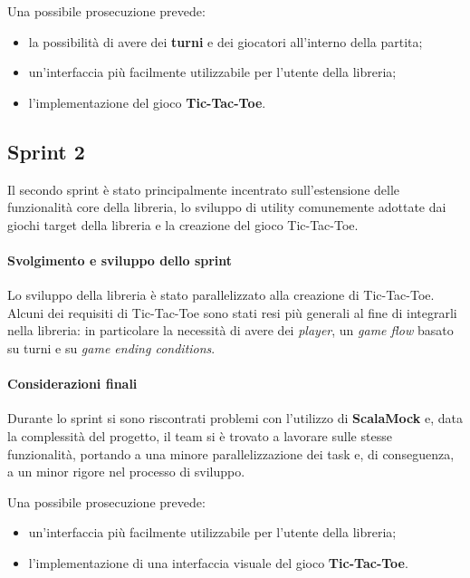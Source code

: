 Una possibile prosecuzione prevede:
\begin{itemize}
  \item la possibilità di avere dei \textbf{turni} e dei giocatori all'interno della partita;
  \item un'interfaccia più facilmente utilizzabile per l'utente della libreria;
  \item l'implementazione del gioco \textbf{Tic-Tac-Toe}.
\end{itemize}

\subsection{Sprint 2}
Il secondo sprint è stato principalmente incentrato sull'estensione delle funzionalità core della libreria, lo sviluppo di utility comunemente adottate dai giochi target della libreria e la creazione del gioco Tic-Tac-Toe.
\paragraph{Svolgimento e sviluppo dello sprint}
Lo sviluppo della libreria è stato parallelizzato alla creazione di Tic-Tac-Toe.
%
Alcuni dei requisiti di Tic-Tac-Toe sono stati resi più generali al fine di integrarli nella libreria: in particolare la necessità di avere dei \textit{player}, un \textit{game flow} basato su turni e su \textit{game ending conditions}.
\paragraph{Considerazioni finali}
Durante lo sprint si sono riscontrati problemi con l'utilizzo di \textbf{ScalaMock} e, data la complessità del progetto, il team si è trovato a lavorare sulle stesse funzionalità, portando a una minore parallelizzazione dei task e, di conseguenza, a un minor rigore nel processo di sviluppo.

Una possibile prosecuzione prevede:
\begin{itemize}
  \item un'interfaccia più facilmente utilizzabile per l'utente della libreria;
  \item l'implementazione di una interfaccia visuale del gioco \textbf{Tic-Tac-Toe}.
\end{itemize}